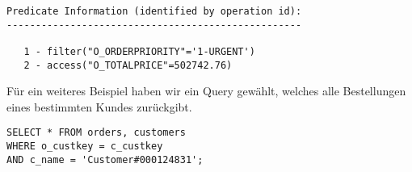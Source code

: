 \documentclass[11pt,a4paper,parskip=half]{scrartcl}
\begin{document}
\begin{lstlisting}
Predicate Information (identified by operation id):                                                                                                                                                                                                                                                          
---------------------------------------------------                                                                                                                                                                                                                                                          
                                                                                                                                                                                                                                                                                                             
   1 - filter("O_ORDERPRIORITY"='1-URGENT')                                                                                                                                                                                                                                                                  
   2 - access("O_TOTALPRICE"=502742.76)                                                                                                                                                                                                                                                                      
\end{lstlisting}

Für ein weiteres Beispiel haben wir ein Query gewählt, welches alle Bestellungen eines bestimmten Kundes zurückgibt.
\begin{lstlisting}
SELECT * FROM orders, customers
WHERE o_custkey = c_custkey
AND c_name = 'Customer#000124831';
\end{lstlisting}
\end{document}
